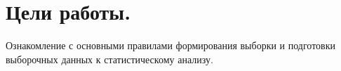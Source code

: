 \setcounter{page}{2}
\section*{Цели работы.}
Ознакомление с основными правилами формирования выборки и подготовки выборочных данных к статистическому анализу.
